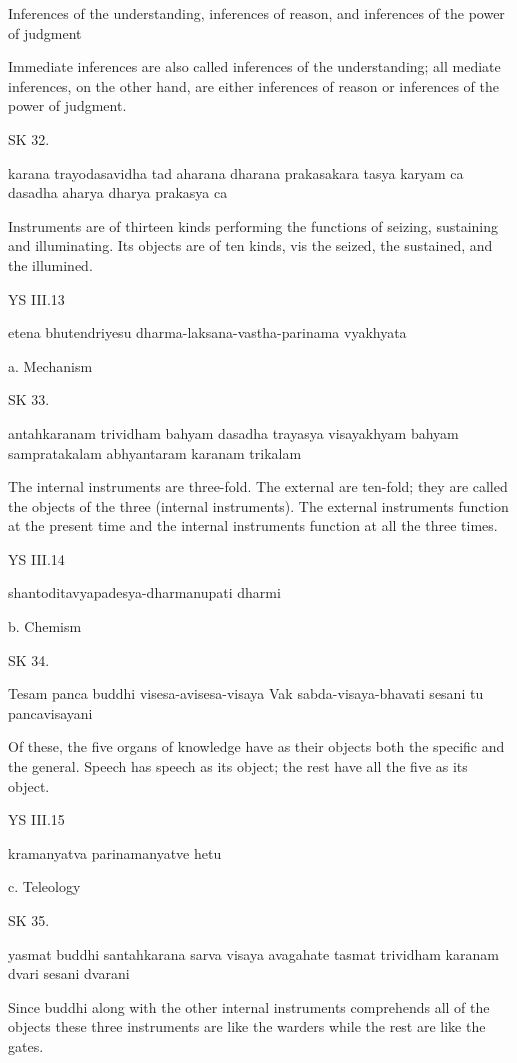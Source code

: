     Inferences of the understanding, inferences of reason,
    and inferences of the power of judgment

        Immediate inferences are also called
        inferences of the understanding;
        all mediate inferences, on the other hand,
        are either inferences of reason
        or inferences of the power of judgment.

SK 32.

karana trayodasavidha tad aharana dharana prakasakara
tasya karyam ca dasadha aharya dharya prakasya ca

Instruments are of thirteen kinds performing the functions of
seizing, sustaining and illuminating.
Its objects are of ten kinds, vis
the seized, the sustained, and the illumined.

YS III.13

    etena bhutendriyesu dharma-laksana-vastha-parinama vyakhyata

    a. Mechanism

SK 33.

antahkaranam trividham bahyam dasadha trayasya visayakhyam
bahyam sampratakalam abhyantaram karanam trikalam

The internal instruments are three-fold.
The external are ten-fold;
they are called the objects of the three (internal instruments).
The external instruments function at the present time and
the internal instruments function at all the three times.

YS III.14

    shantoditavyapadesya-dharmanupati dharmi

    b. Chemism

SK 34.

Tesam panca buddhi visesa-avisesa-visaya
Vak sabda-visaya-bhavati sesani tu pancavisayani

Of these, the five organs of knowledge have as their objects
both the specific and the general.
Speech has speech as its object;
the rest have all the five as its object.

YS III.15

    kramanyatva parinamanyatve hetu

    c. Teleology

SK 35.

yasmat buddhi santahkarana sarva visaya avagahate
tasmat trividham karanam dvari sesani dvarani

Since buddhi along with the other internal instruments
comprehends all of the objects these three instruments are
like the warders while the rest are like the gates.

